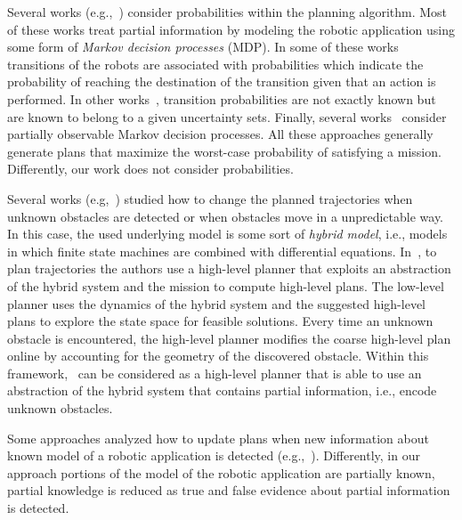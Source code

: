 \begin{enumerate*}
\item Several works (e.g.,~\cite{ding2011ltl,kurniawati2011motion,wolff2012robust,du2012robot,Roy2006,chen2012ltl,nikou2017probabilistic,7078886,7139350,narayanan2015task}) consider probabilities within the planning algorithm.
Most of these works  treat partial information by modeling the robotic application using some form of \emph{Markov decision processes} (MDP).
In some of these works~\cite{ding2011ltl,chen2012ltl} transitions of the robots are associated with probabilities which indicate the probability of reaching the destination of the transition given that an action is performed.
In other works~\cite{wolff2012robust}, transition probabilities are not exactly known but are known to belong to a given uncertainty sets.
Finally, several works~\cite{kurniawati2011motion,Roy2006} consider partially observable Markov decision processes.
All these approaches generally generate plans that maximize the worst-case probability of satisfying a mission.
Differently, our work does not consider probabilities.
\item Several works (e.g,~\cite{lahijanian2016iterative,livingston2012backtracking,l2014safety,nie2016searching,7139412}) studied how to change the planned trajectories when unknown obstacles are detected or when obstacles move in a unpredictable way.
In this case, the used underlying model is some sort of \emph{hybrid model}, i.e., models in which finite state machines are combined with differential equations. 
In~\cite{lahijanian2016iterative}, to plan trajectories the authors use a high-level planner that exploits an abstraction of the hybrid system and the mission to compute high-level plans. 
The low-level planner uses the dynamics of the hybrid system and the suggested high-level plans to explore the state space for feasible solutions.
Every time an unknown obstacle is encountered, the high-level planner modifies the coarse high-level plan online by accounting for the geometry of the discovered obstacle. 
Within this framework, \toolName\ can be considered as a high-level planner that is able to use an abstraction of the hybrid system that contains partial information, i.e., encode unknown obstacles.
\item Some  approaches  analyzed how to update plans when new information about known model of a robotic application is detected (e.g.,~\cite{guo2015multi}). 
Differently, in our approach portions of the model of the robotic application are partially known,  partial knowledge is reduced as true and false evidence about partial information is detected.

\end{enumerate*}
